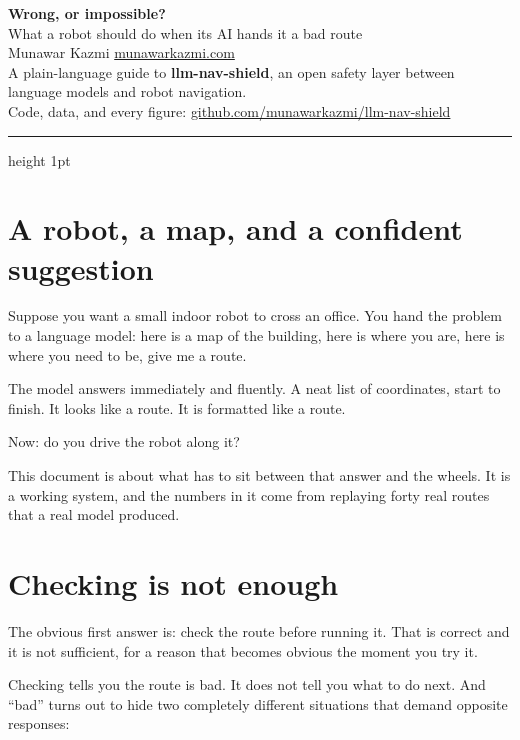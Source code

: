 \documentclass[11pt,a4paper]{article}
\begin{document}
\begin{center}
{\LARGE\bfseries\color{navy} Wrong, or impossible?}\\[6pt]
{\large What a robot should do when its AI hands it a bad route}\\[12pt]
{\small Munawar Kazmi \;\textbullet\; \href{https://munawarkazmi.com}{munawarkazmi.com}}\\[2pt]
{\small A plain-language guide to \textbf{llm-nav-shield}, an open safety layer between language models and robot navigation.}\\[2pt]
{\small Code, data, and every figure: \href{https://github.com/munawarkazmi/llm-nav-shield}{github.com/munawarkazmi/llm-nav-shield}}
\end{center}

\vspace{4pt}
{\color{rule}\hrule height 1pt}
\vspace{10pt}

\section{A robot, a map, and a confident suggestion}

Suppose you want a small indoor robot to cross an office. You hand the problem to a language model: here is a map of the building, here is where you are, here is where you need to be, give me a route.

The model answers immediately and fluently. A neat list of coordinates, start to finish. It looks like a route. It is formatted like a route.

Now: do you drive the robot along it?

This document is about what has to sit between that answer and the wheels. It is a working system, and the numbers in it come from replaying forty real routes that a real model produced.

\section{Checking is not enough}

The obvious first answer is: check the route before running it. That is correct and it is not sufficient, for a reason that becomes obvious the moment you try it.

Checking tells you the route is bad. It does not tell you what to do next. And ``bad'' turns out to hide two completely different situations that demand opposite responses:
\end{document}
